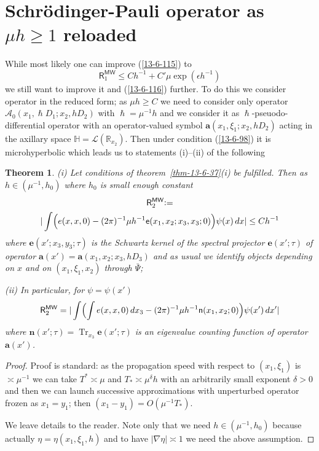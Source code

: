 \documentclass[12pt,oneside,openany,article]{memoir}
\numberwithin{equation}{chapter}
\theoremstyle{plain}
\newtheorem{theorem}{Theorem}[chapter]
\theoremstyle{definition}
\theoremstyle{remark}
\numberwithin{equation}{chapter}
\begin{document}
\section{Schr\"odinger-Pauli operator as $\mu h\ge 1$ reloaded}
\label{sect-13-6-3-4}

While most likely one can improve (\ref{13-6-115})  to 
\begin{equation}
{{\mathsf{R}}}^{{\mathsf{MW}}}_1 \le C h^{-1} +C'  \mu \exp (\epsilon h^{-1})
\label{13-6-117}
\end{equation}
we still want to improve it and (\ref{13-6-116}) further. To do this we consider operator in the reduced form; as $\mu h\ge C$ we need to consider only operator
${\mathcal{A}}_0(x_1,\hslash D_1; x_2, hD_2)$ with $\hslash=\mu^{-1}h$ and we consider it as $\hslash$-pseuodo-differential operator with an operator-valued symbol $\mathbf{a}(x_1,\xi_1; x_2,hD_2)$ acting in the axillary space ${{\mathbb{H}}}={\mathscr{L}}({{\mathbb{R}}}_{x_2})$. Then under condition (\ref{13-6-98}) it is microhyperbolic which leads us to statements (i)--(ii)  of the following

\begin{theorem}\label{thm-13-6-39}
(i) Let conditions of theorem~\ref{thm-13-6-37}(i) be fulfilled. Then as 
$h\in (\mu^{-1},h_0)$ where $h_0$ is small enough constant
\begin{multline}
{{\mathsf{R}}}^{{\mathsf{MW}}}_2{\mathrel{\mathop:}=} \\ |\int \Bigl(e(x,x,0)- (2\pi )^{-1}\mu h^{-1} \mathsf{e}(x_1,x_2;x_3,x_3;0)\Bigr)\psi(x)\,dx|
\le Ch^{-1}
\label{13-6-118}
\end{multline}
where $\mathbf{e}(x';x_3,y_3;\tau)$ is the Schwartz kernel of the spectral projector  $\mathbf{e}(x';\tau)$ of operator 
$\mathbf{a}(x')=\mathbf{a}(x_1,x_2; x_3,hD_3)$ and as usual we identify objects depending on $x$ and on $(x_1,\xi_1,x_2)$ through $\bar{\Psi}$;

\medskip\noindent
(ii) In particular, for $\psi=\psi(x')$ 
\begin{equation}
{{\mathsf{R}}}^{{\mathsf{MW}}}_2= |\int \Bigl(\int e(x,x,0)\,dx_3 - (2\pi )^{-1}\mu h^{-1} \mathsf{n}(x_1,x_2;0)\Bigr)\psi(x')\,dx'|
\label{13-6-119}
\end{equation}
where $\mathbf{n}(x';\tau)={\operatorname{Tr}}_{x_3}\mathbf{e}(x';\tau) $ is an eigenvalue counting function of operator $\mathbf{a}(x')$.
\end{theorem}

\begin{proof}
Proof is standard: as the propagation speed with respect to $(x_1,\xi_1)$ is $\asymp \mu^{-1}$ we can take $T^*\asymp \mu$ and $T_*\asymp \mu^\delta h$ with an arbitrarily small exponent $\delta>0$ and then we can launch successive approximations with unperturbed operator frozen as $x_1=y_1$; then $(x_1-y_1)=O(\mu^{-1}T_*)$.

We leave details to the reader. Note only that we need $h\in (\mu^{-1},h_0)$ because actually $\eta =\eta (x_1,\xi_1,h)$ and to have $|\nabla \eta |\asymp 1$ we need the above assumption.
\end{proof}
\end{document}
